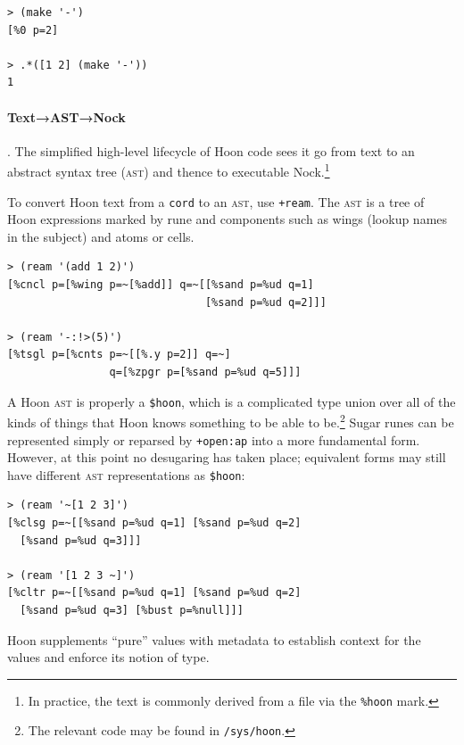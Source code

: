 \documentclass[twoside]{article}
\begin{document}
\begin{lstlisting}[style=listingcode]
> (make '-')
[%0 p=2]

> .*([1 2] (make '-'))
1
\end{lstlisting}

\paragraph[Text→\textsc{ast}→Nock]{Text→AST→Nock}.  The simplified high-level lifecycle of Hoon code sees it go from text to an abstract syntax tree (\textsc{ast}) and thence to executable Nock.\footnote{In practice, the text is commonly derived from a file via the \texttt{\%hoon} mark.}

To convert Hoon text from a \lstinline[style=inlinecode]{cord} to an \textsc{ast}, use \lstinline[style=inlinecode]{+ream}.  The \textsc{ast} is a tree of Hoon expressions marked by rune and components such as wings (lookup names in the subject) and atoms or cells.

\begin{lstlisting}[style=listingcode]
> (ream '(add 1 2)')
[%cncl p=[%wing p=~[%add]] q=~[[%sand p=%ud q=1]
                               [%sand p=%ud q=2]]]

> (ream '-:!>(5)')
[%tsgl p=[%cnts p=~[[%.y p=2]] q=~]
                q=[%zpgr p=[%sand p=%ud q=5]]]
\end{lstlisting}

\noindent
A Hoon \textsc{ast} is properly a \lstinline[style=inlinecode]{$hoon}, which is a complicated type union over all of the kinds of things that Hoon knows something to be able to be.\footnote{The relevant code may be found in \texttt{/sys/hoon}.}  Sugar runes can be represented simply or reparsed by \lstinline[style=inlinecode]{+open:ap} into a more fundamental form.  However, at this point no desugaring has taken place; equivalent forms may still have different \textsc{ast} representations as \lstinline[style=inlinecode]{$hoon}:

\begin{lstlisting}[style=listingblock]
> (ream '~[1 2 3]')
[%clsg p=~[[%sand p=%ud q=1] [%sand p=%ud q=2]
  [%sand p=%ud q=3]]]

> (ream '[1 2 3 ~]')
[%cltr p=~[[%sand p=%ud q=1] [%sand p=%ud q=2]
  [%sand p=%ud q=3] [%bust p=%null]]]
\end{lstlisting}

\noindent
Hoon supplements “pure” values with metadata to establish context for the values and enforce its notion of type.
\end{document}
